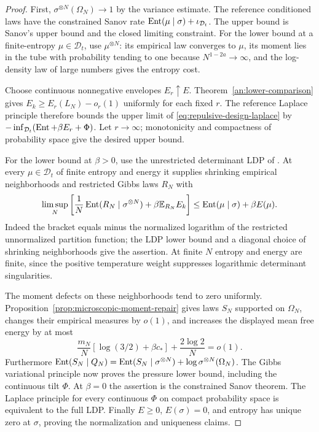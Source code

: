 \begin{proof}
First, $\sigma^{\otimes N}(\Omega_N)\to1$ by the variance estimate.
The reference conditioned laws have the constrained Sanov rate
$\operatorname{Ent}(\mu\mid\sigma)+\iota_{\mathcal D_t}$.  The upper bound is
Sanov's upper bound and the closed limiting constraint.  For the lower
bound at a finite-entropy $\mu\in\mathcal D_t$, use $\mu^{\otimes N}$:
its empirical law converges to $\mu$, its moment lies in the tube with
probability tending to one because $N^{1-2a}\to\infty$, and the
log-density law of large numbers gives the entropy cost.

Choose continuous nonnegative envelopes $E_r\uparrow E$.
Theorem~\ref{an:lower-comparison} gives
$E_k\geq E_r(L_N)-o_r(1)$ uniformly for each fixed $r$. The
reference Laplace principle therefore bounds the upper limit of
\eqref{eq:repulsive-design-laplace} by
$-\inf_{\mathcal D_t}(\operatorname{Ent}+\beta E_r+\Phi)$.  Let $r\to\infty$;
monotonicity and compactness of probability space give the desired
upper bound.

For the lower bound at $\beta>0$, use the unrestricted determinant
LDP of \citet[Theorems 1.1 and 5.7]{prob_berman2017}.  At every
$\mu\in\mathcal D_t$ of finite entropy and energy it supplies
shrinking empirical neighborhoods and restricted Gibbs laws $R_N$
with
\[
 \limsup_N\left[
   \frac1N\operatorname{Ent}(R_N\mid\sigma^{\otimes N})
                  +\beta\mathbb E_{R_N}E_k\right]
 \leq \operatorname{Ent}(\mu\mid\sigma)+\beta E(\mu).
\]
Indeed the bracket equals minus the normalized logarithm of the
restricted unnormalized partition function; the LDP lower bound and
a diagonal choice of shrinking neighborhoods give the assertion.
At finite $N$ entropy and energy are finite, since the positive
temperature weight suppresses logarithmic determinant singularities.

The moment defects on these neighborhoods tend to zero uniformly.
Proposition~\ref{prop:microscopic-moment-repair} gives laws $S_N$
supported on $\Omega_N$, changes their empirical measures by $o(1)$,
and increases the displayed mean free energy by at most
\[
 \frac{m_N}{N}[\log(3/2)+\beta c_*]+\frac{2\log2}{N}=o(1).
\]
Furthermore
$\operatorname{Ent}(S_N\mid Q_N)=\operatorname{Ent}(S_N\mid\sigma^{\otimes N})
+\log\sigma^{\otimes N}(\Omega_N)$.
The Gibbs variational principle now proves the pressure lower bound,
including the continuous tilt $\Phi$.  At $\beta=0$ the assertion
is the constrained Sanov theorem.  The Laplace principle for every
continuous $\Phi$ on compact probability space is equivalent to the
full LDP.  Finally $E\geq0$, $E(\sigma)=0$, and entropy has unique
zero at $\sigma$, proving the normalization and uniqueness claims.
\end{proof}

